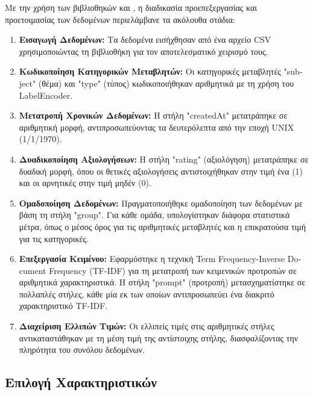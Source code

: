 Με την χρήση των βιβλιοθηκών  και
, η διαδικασία προεπεξεργασίας και προετοιμασίας
των δεδομένων περιελάμβανε τα ακόλουθα στάδια:
\begin{enumerate}
\item
  \textbf{Εισαγωγή Δεδομένων:} Τα δεδομένα εισήχθησαν από ένα αρχείο CSV
  χρησιμοποιώντας τη βιβλιοθήκη  για τον αποτελεσματικό
  χειρισμό τους.
\item
  \textbf{Κωδικοποίηση Κατηγορικών Μεταβλητών:} Οι κατηγορικές
  μεταβλητές "\textlatin{subject}" (θέμα) και "\textlatin{type}" (τύπος)
  κωδικοποιήθηκαν αριθμητικά με τη χρήση του \textlatin{LabelEncoder}.

\item
  \textbf{Μετατροπή Χρονικών Δεδομένων:} Η στήλη \textlatin{"createdAt"}
  μετατράπηκε σε αριθμητική μορφή, αντιπροσωπεύοντας τα δευτερόλεπτα από
  την εποχή \textlatin{UNIX} (1/1/1970).

\item
  \textbf{Δυαδικοποίηση Αξιολογήσεων:} Η στήλη \textlatin{"rating"}
  (αξιολόγηση) μετατράπηκε σε δυαδική μορφή, όπου οι θετικές
  αξιολογήσεις αντιστοιχήθηκαν στην τιμή ένα (1) και οι αρνητικές στην
  τιμή μηδέν (0).

\item
  \textbf{Ομαδοποίηση Δεδομένων:} Πραγματοποιήθηκε ομαδοποίηση των
  δεδομένων με βάση τη στήλη \textlatin{"group"}. Για κάθε ομάδα,
  υπολογίστηκαν διάφορα στατιστικά μέτρα, όπως ο μέσος όρος για τις
  αριθμητικές μεταβλητές και η επικρατούσα τιμή για τις κατηγορικές.

\item
  \textbf{Επεξεργασία Κειμένου:} Εφαρμόστηκε η τεχνική \textlatin{Term
    Frequency-Inverse Document Frequency (TF-IDF)} για τη μετατροπή των
  κειμενικών προτροπών σε αριθμητικά χαρακτηριστικά. Η στήλη
  \textlatin{"prompt"} (προτροπή) μετασχηματίστηκε σε πολλαπλές στήλες,
  κάθε μία εκ των οποίων αντιπροσωπεύει ένα διακριτό χαρακτηριστικό
  \textlatin{TF-IDF}.

\item
  \textbf{Διαχείριση Ελλιπών Τιμών:} Οι ελλιπείς τιμές στις αριθμητικές
  στήλες αντικαταστάθηκαν με τη μέση τιμή της αντίστοιχης στήλης,
  διασφαλίζοντας την πληρότητα του συνόλου δεδομένων.
\end{enumerate}

\subsection{Επιλογή Χαρακτηριστικών}

